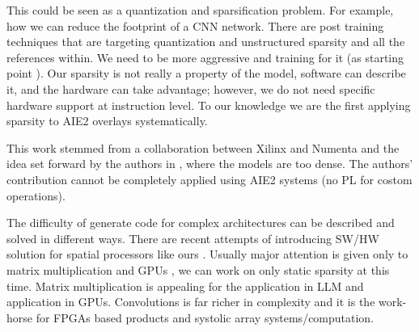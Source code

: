 \documentclass{IEEEtran}
\begin{document}
This could be seen as a quantization and sparsification problem. For
example, how we can reduce the footprint of a CNN network. There are
post training techniques that are targeting quantization and
unstructured sparsity \cite{frantar2023gptq} and all the references
within. We need to be more aggressive and training for it (as starting
point \cite{abs-2102-11289}).  Our sparsity is not really a property
of the model, software can describe it, and the hardware can take
advantage; however, we do not need specific hardware support at
instruction level. To our knowledge we are the first applying sparsity
to AIE2 overlays systematically.

This work stemmed from a collaboration between Xilinx and Numenta and
the idea set forward by the authors in \cite{ahmad2019dense}, where
the models are too dense. The authors' contribution cannot be
completely applied using AIE2 systems (no PL for costom operations).


The difficulty of generate code for complex architectures can be
described and solved in different ways. There are recent attempts of
introducing SW/HW solution for spatial processors like ours
\cite{Huang2021CoSASB,Russo2023MemoryAwareDA,Cai2023InterlayerSS}.
Usually major attention is given only to matrix multiplication and
GPUs \cite{Gray2017GPUKF} \cite{li2023popsparse}, we can work on only
static sparsity at this time. Matrix multiplication is appealing for
the application in LLM and application in GPUs. Convolutions is far
richer in complexity and it is the work-horse for FPGAs based products
and systolic array systems/computation.










\end{document}

